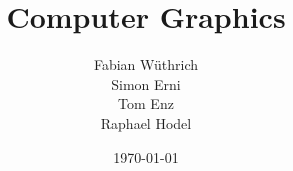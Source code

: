 \titlehead{Hochschule Luzern \\ 
	Technik \& Architektur}
\subject{Zusammenfassung}
\title{Computer Graphics}
\subtitle{}
\author{Fabian Wüthrich \\ 
	Simon Erni \\
	Tom Enz\\
	 Raphael Hodel}
\date{\today}

\maketitle